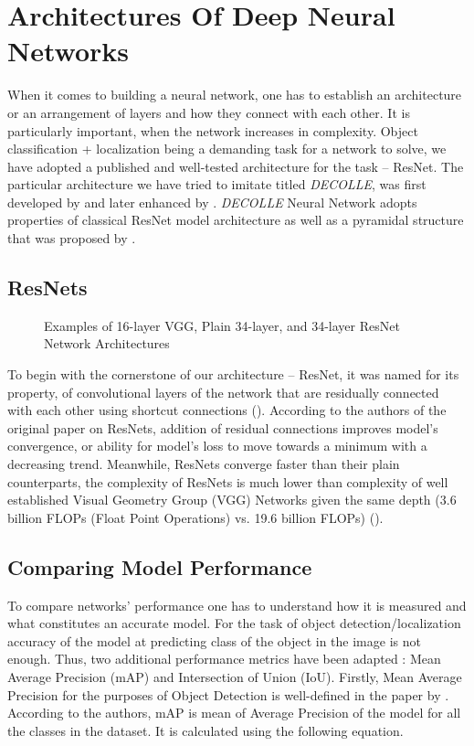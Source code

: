 
\section{Architectures Of Deep Neural Networks}

When it comes to building a neural network, one has to establish an
architecture or an arrangement of layers and how they connect with each other.
It is particularly important, when the network increases in complexity. Object
classification + localization being a demanding task for a network to solve,
we have adopted a published and well-tested architecture for the task --
ResNet. The particular architecture we have tried to imitate titled 
\textit{DECOLLE}, was first developed by  and later
enhanced by . \textit{DECOLLE} Neural Network adopts 
properties of classical ResNet model architecture as well as a pyramidal structure that
was proposed by . 

\subsection{ResNets}

\begin{wrapfigure}[21]{r}{0.42\textwidth}
\begin{center}
\end{center}
	\caption{Examples of 16-layer VGG, Plain 34-layer, and 34-layer ResNet Network 
	Architectures}
\end{wrapfigure}




To begin with the cornerstone of our architecture -- ResNet, it was named for its property,
of convolutional layers of the network that are residually connected with each other using
shortcut connections ().
According to the authors of the original paper on ResNets,
addition of residual connections improves model's convergence, or ability for
model's loss to move towards a minimum with a decreasing trend. Meanwhile,
ResNets converge faster than their plain counterparts, the complexity of 
ResNets is much lower than complexity of well established Visual Geometry
Group (VGG) Networks given the same depth (3.6 billion FLOPs (Float Point 
Operations) vs. 19.6 billion FLOPs) (). 

\subsection{Comparing Model Performance}
To compare networks' performance one has to understand how it is measured and what
constitutes an accurate model. For the task of object detection/localization accuracy
of the model at predicting class of the object in the image is not enough. Thus,
two additional performance metrics have been adapted : Mean Average Precision (mAP) and
Intersection of Union (IoU). Firstly, Mean Average Precision for the purposes of Object
Detection is well-defined in the paper by . According to the authors,
mAP is mean of Average Precision of the model for all the classes in the dataset. It is
calculated using the following equation.


